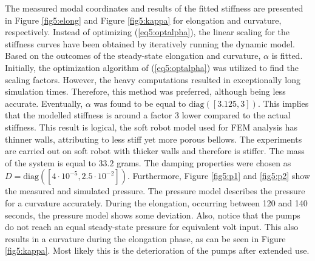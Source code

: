 The measured modal coordinates and results of the fitted stiffness are presented in Figure \ref{fig5:elong} and Figure \ref{fig5:kappa} for elongation and curvature, respectively. Instead of optimizing (\ref{eq5:optalpha}), the linear scaling for the stiffness curves have been obtained by iteratively running the dynamic model. Based on the outcomes of the steady-state elongation and curvature, $\alpha$ is fitted. Initially, the optimization algorithm of (\ref{eq5:optalpha}) was utilized to find the scaling factors. However, the heavy computations resulted in exceptionally long simulation times. Therefore, this method was preferred, although being less accurate. Eventually, $\alpha$ was found to be equal to $\text{diag}([3.125,3])$. This implies that the modelled stiffness is around a factor 3 lower compared to the actual stiffness. This result is logical, the soft robot model used for FEM analysis has thinner walls, attributing to less stiff yet more porous bellows. The experiments are carried out on soft robot with thicker walls and therefore is stiffer. The mass of the system is equal to $33.2$ grams. The damping properties were chosen as $D = \text{diag}([4\cdot 10^{-5},2.5\cdot 10^{-2}])$. Furthermore, Figure \ref{fig5:p1} and \ref{fig5:p2} show the measured and simulated pressure. The pressure model describes the pressure for a curvature accurately. During the elongation, occurring between 120 and 140 seconds, the pressure model shows some deviation. Also, notice that the pumps do not reach an equal steady-state pressure for equivalent volt input. This also results in a curvature during the elongation phase, as can be seen in Figure \ref{fig5:kappa}. Most likely this is the deterioration of the pumps after extended use. 

